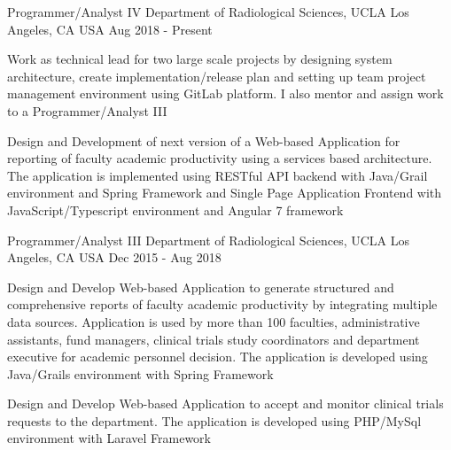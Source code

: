 


\begin{cventries}


  \cventry
    {Programmer/Analyst IV} %
    {Department of Radiological Sciences, UCLA} %
    {Los Angeles, CA USA} %
    {Aug 2018 - Present} %
    {
      \begin{cvitems} %
        \item {Work as technical lead for two large scale projects by designing system architecture, create implementation/release plan and setting up team project management environment using GitLab platform.  I also mentor and assign work to a Programmer/Analyst III }
	\item {Design and Development of next version of a Web-based Application for reporting of faculty academic productivity using a services based architecture. The application is implemented using RESTful API backend with Java/Grail environment and Spring Framework and Single Page Application Frontend with JavaScript/Typescript environment and Angular 7 framework } 
      \end{cvitems}
    }
	

  \cventry
    {Programmer/Analyst III} %
    {Department of Radiological Sciences, UCLA} %
    {Los Angeles, CA USA} %
    {Dec 2015 - Aug 2018} %
    {
      \begin{cvitems} %
        \item {Design and Develop Web-based Application to generate structured and comprehensive reports of faculty academic productivity by integrating multiple data sources. Application is used by more than 100 faculties, administrative assistants, fund managers, clinical trials study coordinators and department executive for academic personnel decision. The application is developed using Java/Grails environment with Spring Framework}
        \item {Design and Develop Web-based Application to accept and monitor clinical trials requests to the department. The application is developed using PHP/MySql environment with Laravel Framework}       
      \end{cvitems}
    }
	

\end{cventries}
